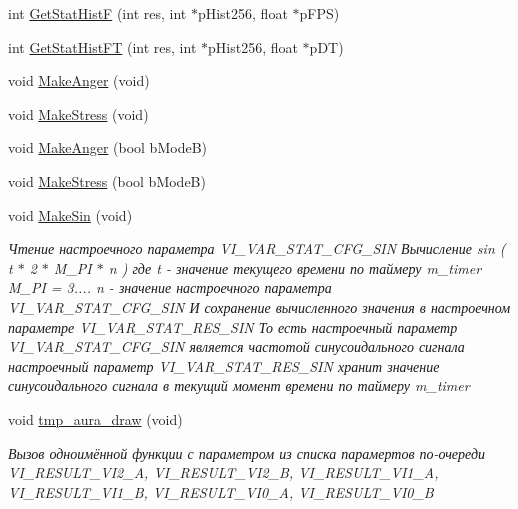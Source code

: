 \begin{DoxyCompactItemize}
\item 
int \hyperlink{class_c_v_i_engine_base_a18bccff2c758d80e3d720953a0d949c1}{Get\+Stat\+Hist\+F} (int res, int $\ast$p\+Hist256, float $\ast$p\+F\+P\+S)
\item 
int \hyperlink{class_c_v_i_engine_base_ab631a7093c3f9e3e15b5a84e61358374}{Get\+Stat\+Hist\+F\+T} (int res, int $\ast$p\+Hist256, float $\ast$p\+D\+T)
\item 
void \hyperlink{class_c_v_i_engine_base_adf949a2b1abf18f519937d3f787c5abf}{Make\+Anger} (void)
\item 
void \hyperlink{class_c_v_i_engine_base_a746c67a403f60418bf26e1e686db0c0c}{Make\+Stress} (void)
\item 
void \hyperlink{class_c_v_i_engine_base_a04eac6867b0a19908706aa4181fc017e}{Make\+Anger} (bool b\+Mode\+B)
\item 
void \hyperlink{class_c_v_i_engine_base_a35022e842e74177678858dddd0d274ee}{Make\+Stress} (bool b\+Mode\+B)
\item 
void \hyperlink{class_c_v_i_engine_base_af5e0da5e3318399f27c259733db69be0}{Make\+Sin} (void)
\begin{DoxyCompactList}\small\item\em Чтение настроечного параметра V\+I\+\_\+\+V\+A\+R\+\_\+\+S\+T\+A\+T\+\_\+\+C\+F\+G\+\_\+\+S\+I\+N Вычисление sin ( t $\ast$ 2 $\ast$ M\+\_\+\+P\+I $\ast$ n ) где t -\/ значение текущего времени по таймеру m\+\_\+timer M\+\_\+\+P\+I = 3.... n -\/ значение настроечного параметра V\+I\+\_\+\+V\+A\+R\+\_\+\+S\+T\+A\+T\+\_\+\+C\+F\+G\+\_\+\+S\+I\+N И сохранение вычисленного значения в настроечном параметре V\+I\+\_\+\+V\+A\+R\+\_\+\+S\+T\+A\+T\+\_\+\+R\+E\+S\+\_\+\+S\+I\+N То есть настроечный параметр V\+I\+\_\+\+V\+A\+R\+\_\+\+S\+T\+A\+T\+\_\+\+C\+F\+G\+\_\+\+S\+I\+N является частотой синусоидального сигнала настроечный параметр V\+I\+\_\+\+V\+A\+R\+\_\+\+S\+T\+A\+T\+\_\+\+R\+E\+S\+\_\+\+S\+I\+N хранит значение синусоидального сигнала в текущий момент времени по таймеру m\+\_\+timer \end{DoxyCompactList}\item 
void \hyperlink{class_c_v_i_engine_base_a6b60fbe47fd49415ccbc4e55cc6e858d}{tmp\+\_\+aura\+\_\+draw} (void)
\begin{DoxyCompactList}\small\item\em Вызов одноимённой функции с параметром из списка парамертов по-\/очереди V\+I\+\_\+\+R\+E\+S\+U\+L\+T\+\_\+\+V\+I2\+\_\+\+A, V\+I\+\_\+\+R\+E\+S\+U\+L\+T\+\_\+\+V\+I2\+\_\+\+B, V\+I\+\_\+\+R\+E\+S\+U\+L\+T\+\_\+\+V\+I1\+\_\+\+A, V\+I\+\_\+\+R\+E\+S\+U\+L\+T\+\_\+\+V\+I1\+\_\+\+B, V\+I\+\_\+\+R\+E\+S\+U\+L\+T\+\_\+\+V\+I0\+\_\+\+A, V\+I\+\_\+\+R\+E\+S\+U\+L\+T\+\_\+\+V\+I0\+\_\+\+B \end{DoxyCompactList}\item 

\end{DoxyCompactItemize}
